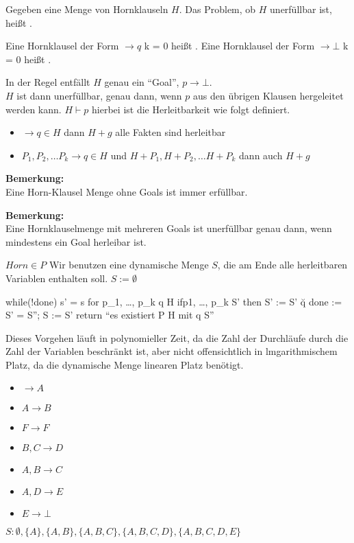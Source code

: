 \begin{definition}
    Gegeben eine Menge von Hornklauseln $H$.
    Das Problem, ob $H$ unerfüllbar ist, heißt .
\end{definition}

\begin{definition}
    Eine Hornklausel der Form $\rightarrow q$ k = 0 heißt .
    Eine Hornklausel der Form $\rightarrow \bot$ k = 0 heißt .
\end{definition}

In der Regel entfällt $H$ genau ein ``Goal'', $p\rightarrow \bot$.
\\
$H$ ist dann unerfüllbar, genau dann, wenn $p$ aus den übrigen Klausen hergeleitet werden kann. $H \vdash p$ hierbei ist die Herleitbarkeit wie folgt definiert.
\begin{itemize}
\item $\rightarrow q \in H$ dann $H+g$ alle Fakten sind herleitbar
\item $P_1, P_2, \dots P_k \rightarrow q \in H$ und
$H+P_1, H+P_2, \dots H+P_k$ dann auch $H+g$
\end{itemize}

\textbf{Bemerkung:}\\
Eine Horn-Klausel Menge ohne Goals ist immer erfüllbar.

\textbf{Bemerkung:}\\
Eine Hornklauselmenge mit mehreren Goals ist unerfüllbar
genau dann, wenn mindestens ein Goal herleibar ist.

\begin{satz}
$Horn \in P$ Wir benutzen eine dynamische Menge $S$, die am Ende alle
herleitbaren Variablen enthalten soll. $S:=\emptyset$
\end{satz}

\begin{codebox}[javascript]
while(!done)
  s' =  s
  for p_1, \dots, p_k  \rightarrow q \in H
    if{p1, \dots, p_k} \seteq S' then
      S' := S' \u {q}
    done := S' = S''; S := S' 
return ``es existiert P \rightarrow \bot \in H mit q \subseteq S''
\end{codebox}

Dieses Vorgehen läuft in polynomieller Zeit, da die Zahl der
Durchläufe durch die Zahl der Variablen beschränkt ist, aber nicht
offensichtlich in lmgarithmischem Platz, da die dynamische Menge linearen Platz
benötigt.

\begin{beispiel}
    \begin{itemize}
    \item $ \rightarrow A $
    \item $ A \rightarrow B $
    \item $ F\rightarrow F $
    \item $ B,C \rightarrow D $
    \item $ A,B \rightarrow C $
    \item $ A,D \rightarrow E $
    \item $ E\rightarrow \bot $
    \end{itemize}
    $S:\emptyset ,\{A\},\{A,B\},\{A,B,C\},\{A,B,C,D\},\{A,B,C,D,E\}$
\end{beispiel}

